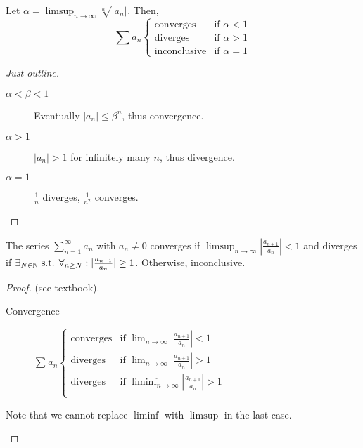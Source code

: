 \begin{theorem}
	\label{thm:3.33}
	Let $\alpha=\limsup_{n\to \infty}{\sqrt[n]{|a_n|}}$. Then,
	\[
		\sum{a_{n}}
		\begin{cases}
			\text{converges}    & \text{if } \alpha<1 \\
			\text{diverges}     & \text{if } \alpha>1 \\
			\text{inconclusive} & \text{if } \alpha=1
		\end{cases}
	\]

	\begin{proof}[Just outline]
		\begin{description}
			\item[$\alpha< \beta < 1$]
			      Eventually $|a_n|\le \beta^{n}$, thus convergence.
			\item[$\alpha > 1$]
			      $|a_{n}|>1$ for infinitely many $n$, thus divergence.
			\item[$\alpha=1$]
			      $\frac{1}{n}$ diverges, $\frac{1}{n^2}$ converges.
		\end{description}
	\end{proof}
\end{theorem}
\begin{theorem}
	\label{thm:3.34}
	The series $\sum_{n=1}^{\infty}{a_{n}}$ with $a_{n}\neq 0$ converges if $\limsup_{n\to \infty}{|\frac{a_{n+1}}{a_{n}}|}<1$ and diverges if $\exists_{N \in \mathbb{N}} \text{ s.t. } \forall_{n \ge  N}:  |\frac{a_{n+1}}{a_{n}}|\ge 1 $. Otherwise, inconclusive.
	\begin{proof}
		(see textbook).\\
		\begin{description}
			\item[Convergence]
			      $\sum_{}{a_{n}}
				      \begin{cases}
					      \text{converges} & \text{if } \lim_{n\to \infty}{|\frac{a_{n+1}}{a_{n}}|}<1    \\
					      \text{diverges}  & \text{if } \lim_{n\to \infty}{|\frac{a_{n+1}}{a_{n}}|}>1    \\
					      \text{diverges}  & \text{if } \liminf_{n\to \infty}{|\frac{a_{n+1}}{a_{n}}|}>1 \\
				      \end{cases}
			      $
		\end{description}
		\begin{note}
			Note that we cannot replace $\liminf$ with $\limsup$ in the last case.
		\end{note}
	\end{proof}
\end{theorem}

